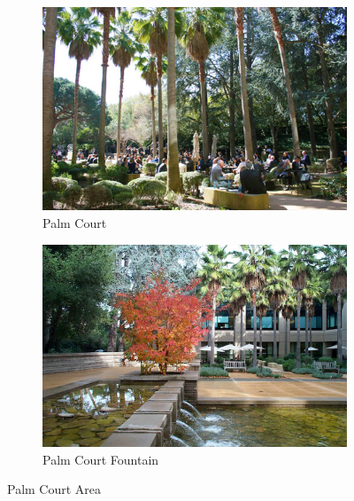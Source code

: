 \documentclass[11pt]{article}
\begin{document}
\begin{figure}
\centering
\begin{subfigure}{.5\textwidth}
  \centering
  \includegraphics[width=.9\linewidth]{fig/palmct}
  \caption{Palm Court}
  \label{fig:palmct}
\end{subfigure}%
\begin{subfigure}{.5\textwidth}
  \centering
  \includegraphics[width=.9\linewidth]{fig/palmfountain}
  \caption{Palm Court Fountain}
  \label{fig:palmfnt}
\end{subfigure}
\caption{Palm Court Area}
\label{fig:palm-court}
\end{figure}
\end{document}
